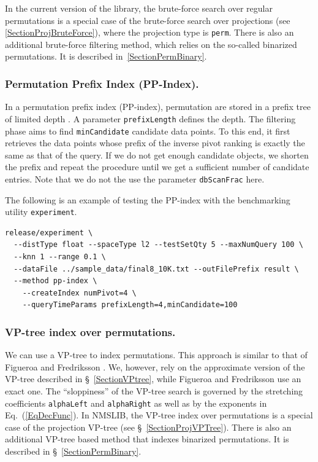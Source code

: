 \documentclass[runningheads,a4paper]{llncs}
\newcommand{\ttt}[1]{\texttt{#1}}
\begin{document}
{In the current version of the library, the brute-force search over
regular permutations is a special case of the brute-force search
over projections (see \ref{SectionProjBruteForce}), where the projection type is \ttt{perm}. 
There is also an additional brute-force filtering method, which relies on the so-called binarized permutations.
It is described in~\ref{SectionPermBinary}.

\subsubsection{Permutation Prefix Index  (PP-Index).}
In a permutation prefix index (PP-index),
 permutation are stored in a prefix tree 
of limited depth \cite{Esuli:2012}. A parameter \ttt{prefixLength}
defines the depth.
The filtering phase aims to find \ttt{minCandidate} candidate data points.
To this end, it first retrieves the data points whose prefix of the inverse pivot ranking is exactly the same
as that of the query. If we do not get enough candidate objects, we shorten the prefix
and repeat the procedure until we get a sufficient number of candidate entries.
Note that we do not the use the parameter \ttt{dbScanFrac} here.

The following is an example of testing the PP-index with the benchmarking utility \ttt{experiment}.
{
\footnotesize
\begin{verbatim}
release/experiment \
  --distType float --spaceType l2 --testSetQty 5 --maxNumQuery 100 \
  --knn 1 --range 0.1 \
  --dataFile ../sample_data/final8_10K.txt --outFilePrefix result \
  --method pp-index \
    --createIndex numPivot=4 \
    --queryTimeParams prefixLength=4,minCandidate=100
\end{verbatim}
}

\subsubsection{VP-tree index over permutations.}
We can use a VP-tree to index permutations.
This approach is similar to that of Figueroa and Fredriksson \cite{figueroa2009speeding}. 
We, however, rely on the approximate version of the VP-tree described in \S~\ref{SectionVPtree},
while Figueroa and Fredriksson use an exact one.
The ``sloppiness'' of the VP-tree search is governed by the stretching coefficients 
 \ttt{alphaLeft}   and \ttt{alphaRight} as well as by the exponents in Eq.~(\ref{EqDecFunc}).
In NMSLIB, the VP-tree index over permutations is a special
case of the projection VP-tree (see \S~\ref{SectionProjVPTree}).
There is also an additional VP-tree based method that indexes binarized permutations.
It is described in \S~\ref{SectionPermBinary}.

}
\end{document}
